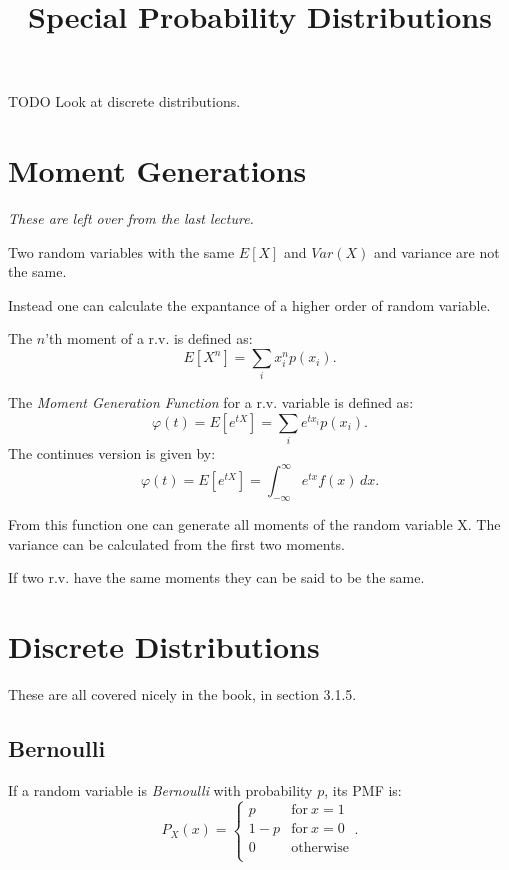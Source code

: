 \title{Special Probability Distributions}

TODO Look at discrete distributions.

\section{Moment Generations}
\emph{These are left over from the last lecture.}

Two random variables with the same $E[X]$ and $Var(X)$ and variance are not the same.

Instead one can calculate the expantance of a higher order of random variable.

\begin{definition}
    The $n$'th moment of a r.v. is defined as: \[
        E[X^n] = \sum_{i} x_{i}^{n} p(x_i)
    .\] 
\end{definition}

\begin{definition}
    The \emph{Moment Generation Function} for a r.v. variable is defined as: \[
        \varphi(t) = E[e^{t X}] = \sum_{i} e^{t x_i} p(x_i)
.\] 
    The continues version is given by: \[
        \varphi(t) = E[e^{t X}] = \int_{-\infty}^{\infty} e^{tx} f(x) \,dx
    .\] 
\end{definition}

From this function one can generate all moments of the random variable X.
The variance can be calculated from the first two moments.

\begin{lemma}
    If two r.v. have the same moments they can be said to be the same.
\end{lemma}

\section{Discrete Distributions}

These are all covered nicely in the book, in section 3.1.5.

\subsection{Bernoulli}

\begin{definition}
    If a random variable is \emph{Bernoulli} with probability $p$, its PMF is: \[
        P_X(x) = \left\{
            \begin{array}{ll}
                p & \mathrm{for} \: x = 1 \\
                1 - p & \mathrm{for} \: x = 0 \\
                0 & \mathrm{otherwise} \\
            \end{array}
            \right.
    .\] 
\end{definition}

